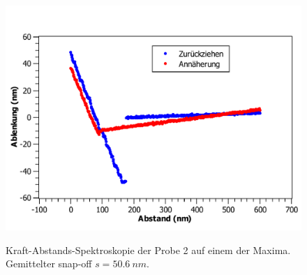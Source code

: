 \documentclass[
	a4paper,
	12pt,
	pagesize,
	ngerman
]{scrartcl}
\begin{document}
\begin{figure}[H]
{			\label{fig_cd_ds5}}{\includegraphics[width=.49\linewidth]{images/CD/DS5}}
			\caption{Kraft-Abstands-Spektroskopie der Probe 2 auf einem der Maxima. Gemittelter snap-off $s=\SI{50.6}{nm}$.} %
			\label{fig_cd_ds}
\end{figure}

\begin{figure}[H]

\end{figure}
\end{document}
